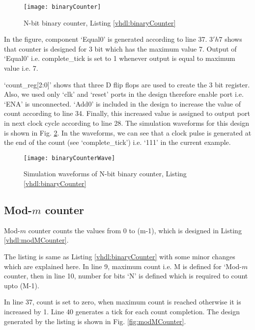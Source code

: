 

\begin{figure}[!h]
	\centering
	\texttt{[image: binaryCounter]}
	\caption{N-bit binary counter, Listing \ref{vhdl:binaryCounter}}
	\label{fig:binaryCounter}
\end{figure}

\begin{explanation}
	In the figure, component `Equal0' is generated according to line 37. $3'h7$ shows that counter is designed for 3 bit which has the maximum value 7. Output of `Equal0' i.e.  complete\_tick is set to 1 whenever output is equal to maximum value i.e. 7.
	
	`count\_reg[2:0]' shows that three D flip flops are used to create the 3 bit register. Also, we used only `clk' and `reset' ports in the design therefore enable port i.e. `ENA' is unconnected. `Add0' is included in the design to increase the value of count according to line 34. Finally, this increased value is assigned to output port in next clock cycle according to line 28. The simulation waveforms for this design is shown in Fig. \ref{fig:binaryCounterWave}. In the waveforms, we can see that a clock pulse is generated at the end of the count (see `complete\_tick') i.e. `111' in the current example. 
\end{explanation}

\begin{figure}[!h]
	\centering
	\texttt{[image: binaryCounterWave]}
	\caption{Simulation waveforms of N-bit binary counter, Listing \ref{vhdl:binaryCounter}}
	\label{fig:binaryCounterWave}
\end{figure}

\subsection{Mod-$m$ counter} \label{sec:ModMCounter}
Mod-$m$ counter counts the values from 0 to (m-1), which is designed in Listing \ref{vhdl:modMCounter}. 

\begin{explanation}
	The listing is same as Listing \ref{vhdl:binaryCounter} with some minor changes which are explained here. In line 9, maximum count i.e. M is defined for `Mod-$m$ counter, then in line 10, number for bits `N' is defined which is required to count upto (M-1).
	
	In line 37, count is set to zero, when maximum count is reached otherwise it is increased by 1. Line 40 generates a tick for each count completion. The design generated by the listing is shown in Fig. \ref{fig:modMCounter}.
\end{explanation}


